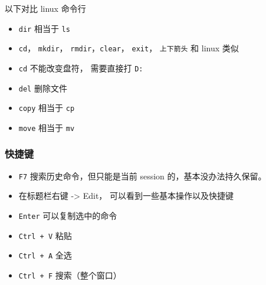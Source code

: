 

\begin{issues}
\issueDraft
\end{issues}

以下对比 linux 命令行
\begin{itemize}
\item \verb`dir` 相当于 \verb`ls`
\item \verb`cd`， \verb`mkdir`， \verb`rmdir`，\verb`clear`， \verb`exit`， \verb`上下箭头` 和 linux 类似
\item \verb`cd` 不能改变盘符， 需要直接打 \verb`D:`
\item \verb`del` 删除文件
\item \verb`copy` 相当于 \verb`cp`
\item \verb`move` 相当于 \verb`mv`
\end{itemize}

\subsubsection{快捷键}
\begin{itemize}
\item \verb`F7` 搜索历史命令，但只能是当前 session 的，基本没办法持久保留。
\item 在标题栏右键 -> Edit， 可以看到一些基本操作以及快捷键
\item \verb`Enter` 可以复制选中的命令
\item \verb`Ctrl + V` 粘贴
\item \verb`Ctrl + A` 全选
\item \verb`Ctrl + F` 搜索（整个窗口）
\end{itemize}
